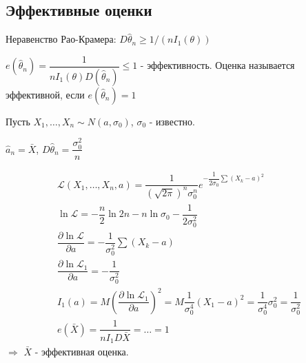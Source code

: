 \subsection{Эффективные оценки}

Неравенство Рао-Крамера: $D\hat \theta_n \geqslant 1 / (n I_1(\theta))$

\begin{def}
  $e(\hat \theta_n) = \dfrac{1}{n I_1(\theta) D(\hat\theta_n)} \leqslant 1$ - эффективность.
  Оценка называется эффективной, если $e(\hat\theta_n) = 1$
\end{def}

\begin{ex}
  Пусть $X_1, \dots, X_n \sim N(a, \sigma_0)$, $\sigma_0$ - известно.
  
  $\hat a_n = \bar X$, $D\hat\theta_n = \dfrac{\sigma_0^2}{n}$

  \begin{multline*}
    \mathcal{L} (X_1, \dots, X_n, a)
    = \dfrac{1}{(\sqrt{2\pi})^n \sigma_0^n} e^{-\dfrac{1}{2\sigma_0} \sum (X_k-a)^2 } \\
    \ln \mathcal{L} = -\dfrac{n}{2} \ln 2n - n \ln \sigma_0 - \dfrac{1}{2\sigma_0^2} \\
    \dfrac{\partial \ln \mathcal{L}}{\partial a} = - \dfrac{1}{\sigma_0^2}\sum (X_k-a) \\
    \dfrac{\partial \ln \mathcal{L}_1}{\partial a} = - \dfrac{1}{\sigma_0^2} \\
    I_1(a) = M( \dfrac{\partial \ln \mathcal{L}_1}{\partial a}  )^2
    = M \dfrac{1}{\sigma_0^4} (X_1-a)^2
    = \dfrac{1}{\sigma_0^4} \sigma_0^2 = \dfrac{1}{\sigma_0^2} \\
    e(\bar X) = \dfrac{1}{n I_1 D\bar X} = \dots = 1
  \end{multline*}
  $\Rightarrow$ $\bar X$ - эффективная оценка.
\end{ex}

